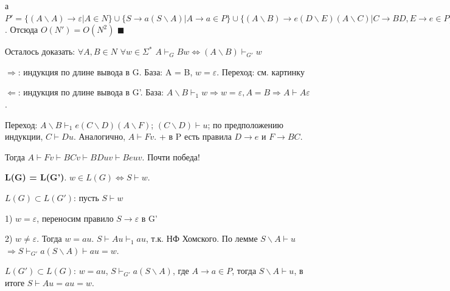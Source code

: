 а $P' = \{(A \backslash A) \rightarrow \varepsilon | A \in N \} \cup \{ S \rightarrow a(S \backslash A) | A \rightarrow a \in P\} \cup \{ (A \backslash B) \rightarrow e (D \backslash E) (A \backslash C) | C \rightarrow BD, E \rightarrow e \in P\} \cup \{ S \rightarrow \varepsilon | S \rightarrow \varepsilon \in P\}$. Отсюда $O(N') = O(N^2)$
$\blacksquare$

Осталось доказать: $\forall A, B \in N$ $\forall w \in \Sigma^*$   $A \vdash_G Bw \Leftrightarrow (A \backslash B) \vdash_{G'} w$

$\Rightarrow$: индукция по длине вывода в G. База: A = B, $w = \varepsilon$. Переход: см. картинку

$\Leftarrow$: индукция по длине вывода в G'. База: $A\backslash B \vdash_1 w \Rightarrow w = \varepsilon, A = B \Rightarrow A \vdash A \varepsilon$.

Переход:  $A\backslash B \vdash_1 e(C \backslash D)(A \backslash F)$; $(C \backslash D) \vdash u$; по предположению индукции, $C \vdash Du$. Аналогично, $A \vdash Fv$. + в P есть правила $D \rightarrow e$ и $F \rightarrow BC$.

Тогда $A \vdash Fv \vdash BCv \vdash BDuv \vdash Beuv$. Почти победа!

\textbf{L(G) = L(G')}. $w \in L(G) \Leftrightarrow S \vdash w$.

$L(G) \subset L(G')$: пусть $S \vdash w$

1) $w = \varepsilon$, переносим правило $S \rightarrow \varepsilon$ в G'

2) $w \neq \varepsilon$. Тогда $w = au$. $S \vdash Au \vdash_1 au$, т.к. НФ Хомского. По лемме $S \backslash A \vdash u$ $\Longrightarrow S \vdash_{G'} a(S \backslash A) \vdash au = w$. 

$L(G') \subset L(G)$:  $w= au$, $S \vdash_{G'} a(S \backslash A)$, где $ A \rightarrow a \in P$, тогда $S \backslash A \vdash u$, в итоге $S \vdash Au = au = w$.
